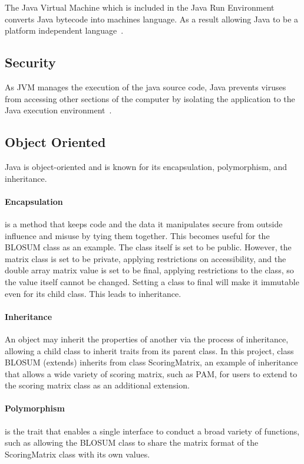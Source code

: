 \documentclass[]{final_report}
\begin{document}
The Java Virtual Machine which is included in the Java Run Environment converts Java bytecode into machines language. As a result allowing Java to be a platform independent language~\cite{schildt2019java}.

\subsection{Security}
As JVM manages the execution of the java source code, Java prevents viruses from accessing other sections of the computer by isolating the application to the Java execution environment~\cite{schildt2019java}.

\subsection{Object Oriented}
Java is object-oriented and is known for its encapsulation, polymorphism, and inheritance.

\paragraph{Encapsulation} is a method that keeps code and the data it manipulates secure from outside influence and misuse by tying them together. This becomes useful for the BLOSUM class as an example. The class itself is set to be public. However, the matrix class is set to be private, applying restrictions on accessibility, and the double array matrix value is set to be final, applying restrictions to the class, so the value itself cannot be changed. Setting a class to final will make it immutable even for its child class. This leads to inheritance.

\paragraph{Inheritance}An object may inherit the properties of another via the process of inheritance, allowing a child class to inherit traits from its parent class. In this project, class BLOSUM (extends) inherits from class ScoringMatrix, an example of inheritance that allows a wide variety of scoring matrix, such as PAM, for users to extend to the scoring matrix class as an additional extension.

\paragraph{Polymorphism} is the trait that enables a single interface to conduct a broad variety of functions, such as allowing the BLOSUM class to share the matrix format of the ScoringMatrix class with its own values.
\end{document}
